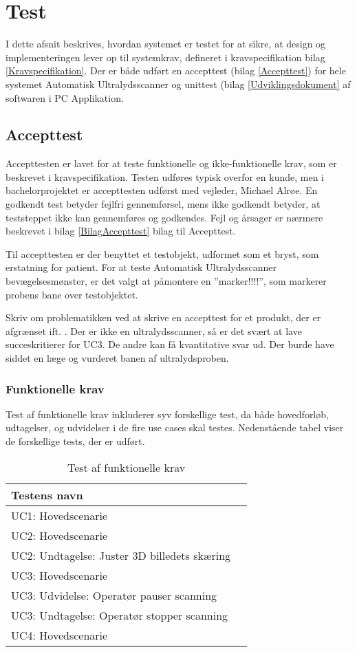 \chapter{Test}\label{Test}
I dette afsnit beskrives, hvordan systemet er testet for at sikre, at design og implementeringen lever op til systemkrav, defineret i kravspecifikation bilag \ref{Kravspecifikation}. Der er både udført en accepttest (bilag \ref{Accepttest})  for hele systemet Automatisk Ultralydsscanner og unittest (bilag \ref{Udviklingsdokument} af softwaren i PC Applikation. 

\section{Accepttest}
Accepttesten er lavet for at teste funktionelle og ikke-funktionelle krav, som er beskrevet i kravspecifikation. Testen udføres typisk overfor en kunde, men i bachelorprojektet er accepttesten udførst med vejleder, Michael Alrøe. En godkendt test betyder fejlfri gennemførsel, mens ikke godkendt betyder, at teststeppet ikke kan gennemføres og godkendes. Fejl og årsager er nærmere beskrevet i bilag \ref{BilagAccepttest} bilag til Accepttest. 




Til accepttesten er der benyttet et testobjekt, udformet som et bryst, som erstatning for patient. For at teste Automatisk Ultralydsscanner bevægelsesmønster, er det valgt at påmontere en ”marker!!!!”, som markerer probens bane over testobjektet. 

Skriv om problematikken ved at skrive en accepttest for et produkt, der er afgrænset ift. . Der er ikke en ultralydsscanner, så er det svært at lave succeskritierer for UC3. 
De andre kan få kvantitative svar ud. 
Der burde have siddet en læge og vurderet banen af ultralydsproben. 


\subsection{Funktionelle krav} 
Test af funktionelle krav inkluderer syv forskellige test, da både hovedforløb, udtagelser, og udvidelser i de fire use cases skal testes. Nedenstående tabel viser de forskellige tests, der er udført. 

\begin{table}[htb]
\centering
\begin{tabular}{ | l | p{} | }
\hline
\textbf{Testens navn} \\\hline
UC1: Hovedscenarie\\\hline 
UC2: Hovedscenarie \\\hline 
UC2: Undtagelse: Juster 3D billedets skæring \\\hline 
UC3: Hovedscenarie \\\hline 
UC3: Udvidelse: Operatør pauser scanning \\\hline 
UC3: Undtagelse: Operatør stopper scanning \\\hline 
UC4: Hovedscenarie \\\hline 
\end{tabular}
\caption{Test af funktionelle krav} 
\end{table}

